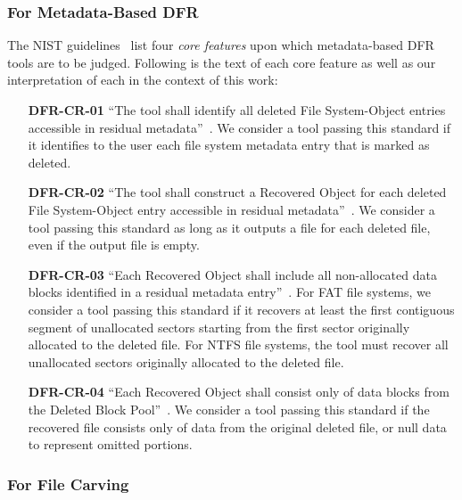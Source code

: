 \subsubsection{For Metadata-Based DFR}
\begin{paraphrase}
 The NIST guidelines~\cite{meta:dfr:standards} list four \emph{core features} upon which metadata-based DFR tools are to be judged.
Following is the text of each core feature as well as our interpretation of each in the context of this work:
\begin{itemize}
 \item[\textbf{DFR-CR-01}] ``The tool shall identify all deleted File System-Object entries accessible in residual metadata''~\cite{meta:dfr:standards}.
 We consider a tool passing this standard if it identifies to the user each file system metadata entry that is marked as deleted.
 \item[\textbf{DFR-CR-02}] ``The tool shall construct a Recovered Object for each deleted File System-Object entry accessible in residual metadata''~\cite{meta:dfr:standards}.
 We consider a tool passing this standard as long as it outputs a file for each deleted file, even if the output file is empty.
 \item[\textbf{DFR-CR-03}] ``Each Recovered Object shall include all non-allocated data blocks identified in a residual metadata entry''~\cite{meta:dfr:standards}.
 For FAT file systems, we consider a tool passing this standard if it recovers at least the first contiguous segment of unallocated sectors starting 
from the first sector originally allocated to the deleted file. For NTFS file systems, the tool must recover all unallocated sectors originally allocated to the deleted file.
 \item[\textbf{DFR-CR-04}] ``Each Recovered Object shall consist only of data blocks from the Deleted Block Pool''~\cite{meta:dfr:standards}.
 We consider a tool passing this standard if the recovered file consists only of data from the original deleted file, or null data to represent omitted portions.
\end{itemize}

\end{paraphrase}

\subsubsection{For File Carving} \label{sec:carving_features}

